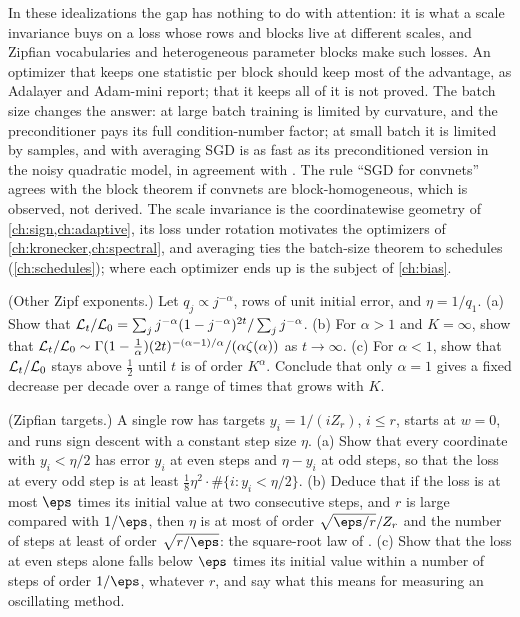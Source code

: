 \begin{refsection}
In these idealizations the gap has nothing to do with attention: it is what a scale invariance buys on a loss whose rows and blocks live at different scales, and Zipfian vocabularies and heterogeneous parameter blocks make such losses. An optimizer that keeps one statistic per block should keep most of the advantage, as Adalayer and Adam-mini report; that it keeps all of it is not proved. The batch size changes the answer: at large batch training is limited by curvature, and the preconditioner pays its full condition-number factor; at small batch it is limited by samples, and with averaging SGD is as fast as its preconditioned version in the noisy quadratic model, in agreement with \textcite{MarekEtAl2025}. The rule ``SGD for convnets'' agrees with the block theorem if convnets are block-homogeneous, which is observed, not derived. The scale invariance is the coordinatewise geometry of \cref{ch:sign,ch:adaptive}, its loss under rotation motivates the optimizers of \cref{ch:kronecker,ch:spectral}, and averaging ties the batch-size theorem to schedules (\cref{ch:schedules}); where each optimizer ends up is the subject of \cref{ch:bias}.

\begin{exercises}
\item \consolidation (Other Zipf exponents.) Let $q_j\propto j^{-\alpha}$, rows of unit initial error, and $\eta=1/q_1$. (a) Show that $\mathcal{L}_t/\mathcal{L}_0=\sum_jj^{-\alpha}(1-j^{-\alpha})^{2t}/\sum_jj^{-\alpha}$. (b) For $\alpha>1$ and $K=\infty$, show that $\mathcal{L}_t/\mathcal{L}_0\sim\Gamma(1-\frac1\alpha)(2t)^{-(\alpha-1)/\alpha}/(\alpha\zeta(\alpha))$ as $t\to\infty$. (c) For $\alpha<1$, show that $\mathcal{L}_t/\mathcal{L}_0$ stays above $\frac12$ until $t$ is of order $K^\alpha$. Conclude that only $\alpha=1$ gives a fixed decrease per decade over a range of times that grows with $K$. \label{ex:transformers:alpha}

\item \consolidation\hard (Zipfian targets.) A single row has targets $y_i=1/(iZ_r)$, $i\le r$, starts at $w=0$, and runs sign descent with a constant step size $\eta$. (a) Show that every coordinate with $y_i<\eta/2$ has error $y_i$ at even steps and $\eta-y_i$ at odd steps, so that the loss at every odd step is at least $\frac18\eta^2\cdot\#\{i:y_i<\eta/2\}$. (b) Deduce that if the loss is at most $\eps$ times its initial value at two consecutive steps, and $r$ is large compared with $1/\eps$, then $\eta$ is at most of order $\sqrt{\eps/r}/Z_r$ and the number of steps at least of order $\sqrt{r/\eps}$: the square-root law of \textcite{KunstnerBach2025}. (c) Show that the loss at even steps alone falls below $\eps$ times its initial value within a number of steps of order $1/\eps$, whatever $r$, and say what this means for measuring an oscillating method. \label{ex:transformers:signzipf}


\end{exercises}
\end{refsection}
